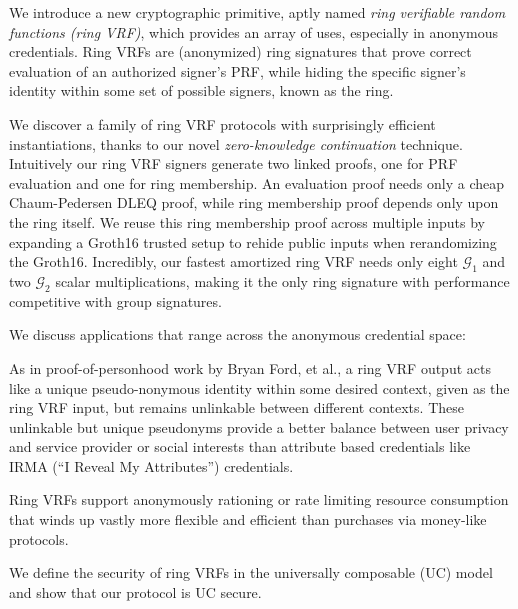
\def\eprintsmallskip{\smallskip}{}%
We introduce a new cryptographic primitive, aptly named
 \emph{ring verifiable random functions (ring VRF)},
 which provides an array of uses, especially in anonymous credentials.
Ring VRFs are (anonymized) ring signatures that prove correct evaluation
of an authorized signer's PRF, while hiding the specific signer's
identity within some set of possible signers, known as the ring.

We discover a family of ring VRF protocols with surprisingly efficient
instantiations, thanks to our novel {\em zero-knowledge continuation} technique.
%
Intuitively our ring VRF signers generate two linked proofs,
 one for PRF evaluation and one for ring membership. 
An evaluation proof needs only a cheap Chaum-Pedersen DLEQ proof,
while ring membership proof depends only upon the ring itself.
We reuse this ring membership proof across multiple inputs
by expanding a Groth16 trusted setup to rehide public inputs when
 rerandomizing the Groth16.
%
Incredibly, our fastest amortized ring VRF needs only eight $\mathcal{G}_1$
 and two $\mathcal{G}_2$ scalar multiplications, 
making it the only ring signature with performance competitive with group signatures.

\eprintsmallskip

We discuss applications that range across the anonymous credential space:

As in proof-of-personhood work by Bryan Ford, et al.,
a ring VRF output acts like a unique pseudo-nonymous identity
 within some desired context, given as the ring VRF input,
but remains unlinkable between different contexts. 
These unlinkable but unique pseudonyms provide a better balance between
user privacy and service provider or social interests than attribute
based credentials like IRMA (``I Reveal My Attributes'') credentials.

\eprintsmallskip
Ring VRFs support anonymously rationing or rate limiting resource
consumption that winds up vastly more flexible and efficient than
purchases via money-like protocols.

\eprintsmallskip
We define the security of ring VRFs in the universally composable (UC) model and show that our protocol is UC secure.
